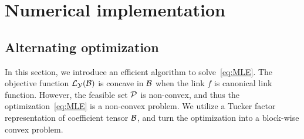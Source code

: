 \documentclass[twoside]{article}
\theoremstyle{plain}
\theoremstyle{definition}
\begin{document}

\section{Numerical implementation}
\subsection{Alternating optimization}
In this section, we introduce an efficient algorithm to solve~\eqref{eq:MLE}. The objective function $\mathcal{L}_{\mathcal{Y}}(\mathcal{B})$ is concave in $\mathcal{B}$ when the link $f$ is canonical link function. However, the feasible set $\mathcal{P}$ is non-convex, and thus the optimization~\eqref{eq:MLE} is a non-convex problem. We utilize a Tucker factor representation of coefficient tensor $\mathcal{B}$, and turn the optimization into a block-wise convex problem. 
\end{document}
